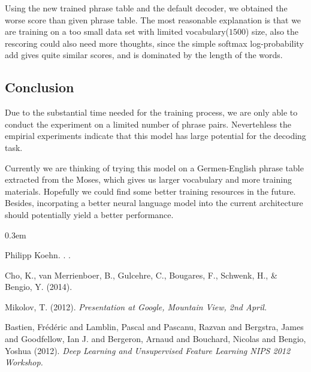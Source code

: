 \documentclass[11pt,letterpaper]{article}
\begin{document}
Using the new trained phrase table and the default decoder, we obtained the worse score than given phrase table. The most reasonable explanation is that we are training on a too small data set with limited vocabulary($1500$) size, also the rescoring could also need more thoughts, since the simple softmax log-probability add gives quite similar scores, and is dominated by the length of the words.

\subsection{Conclusion} %
\label{sub:evaluation} 
Due to the substantial time needed for the training process, we are only able to conduct the experiment on a limited number of phrase pairs. Nevertehless the empirial experiments indicate that this model has large potential for the decoding task. 

Currently we are thinking of trying this model on a Germen-English phrase table extracted from the Moses, which gives us larger vocabulary and more training materials. Hopefully we could find some better training resources in the future. Besides, incorpating a better neural language model into the current architecture should potentially yield a better performance.

\begin{thebibliography}{} \itemsep 0.3em

Philipp Koehn.
.
.

Cho, K., van Merrienboer, B., Gulcehre, C., Bougares, F., Schwenk, H., \& Bengio, Y.
\newblock (2014).

Mikolov, T.
\newblock (2012).
\newblock \textit{Presentation at Google, Mountain View, 2nd April.}

Bastien, Fr{\'{e}}d{\'{e}}ric and Lamblin, Pascal and Pascanu, Razvan and Bergstra, James and Goodfellow, Ian J. and Bergeron, Arnaud and Bouchard, Nicolas and Bengio, Yoshua
\newblock (2012).
\newblock \textit{Deep Learning and Unsupervised Feature Learning NIPS 2012 Workshop.}

\end{thebibliography}
\end{document}
